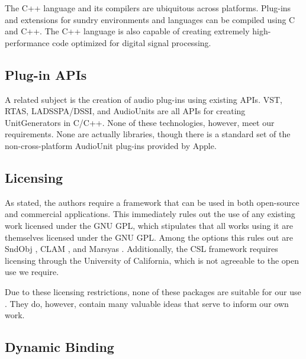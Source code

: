 \documentclass[twoside,10pt]{article}
\begin{document}
The C++ language and its compilers are ubiquitous across platforms.  Plug-ins and extensions for sundry environments and languages can be compiled using C and C++.  The C++ language is also capable of creating extremely high-performance code optimized for digital signal processing.



\subsection{Plug-in APIs} %

A related subject is the creation of audio plug-ins using existing APIs.  VST, RTAS, LADSSPA/DSSI, and AudioUnits are all APIs for creating UnitGenerators in C/C++.  None of these technologies, however, meet our requirements.  None are actually libraries, though there is a standard set of the non-cross-platform AudioUnit plug-ins provided by Apple.



\subsection{Licensing} %

As stated, the authors require a framework that can be used in both open-source and commercial applications.  This immediately rules out the use of any existing work licensed under the GNU GPL, which stipulates that all works using it are themselves licensed under the GNU GPL.  Among the options this rules out are SndObj \cite{Lazzarini:2001}, CLAM \cite{Amatraian:2008}, and Marsyas \cite{Tzanetakis:2008}.  Additionally, the CSL framework \cite{Pope:2003} requires licensing through the University of California, which is not agreeable to the open use we require.

Due to these licensing restrictions, none of these packages are suitable for our use
.  They do, however, contain many valuable ideas that serve to inform our own work.



\subsection{Dynamic Binding} %
\end{document}
